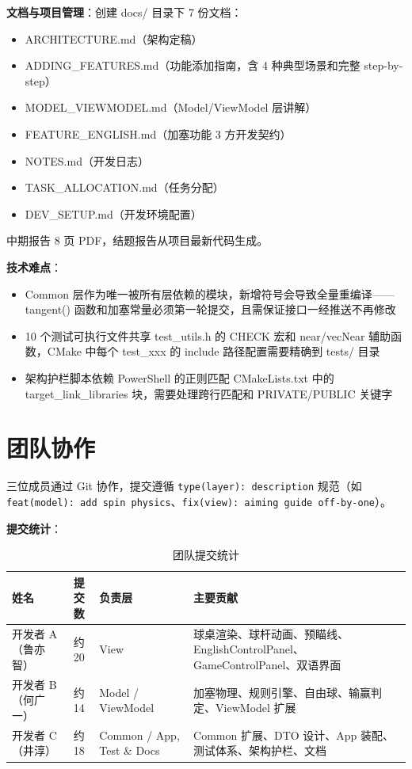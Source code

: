 \documentclass[11pt]{ctexart}
\begin{document}
\textbf{文档与项目管理}：创建 docs/ 目录下 7 份文档：
\begin{itemize}[leftmargin=*]
\item ARCHITECTURE.md（架构定稿）
\item ADDING\_FEATURES.md（功能添加指南，含 4 种典型场景和完整 step-by-step）
\item MODEL\_VIEWMODEL.md（Model/ViewModel 层讲解）
\item FEATURE\_ENGLISH.md（加塞功能 3 方开发契约）
\item NOTES.md（开发日志）
\item TASK\_ALLOCATION.md（任务分配）
\item DEV\_SETUP.md（开发环境配置）
\end{itemize}
中期报告 8 页 PDF，结题报告从项目最新代码生成。

\textbf{技术难点}：
\begin{itemize}
\item Common 层作为唯一被所有层依赖的模块，新增符号会导致全量重编译——tangent() 函数和加塞常量必须第一轮提交，且需保证接口一经推送不再修改
\item 10 个测试可执行文件共享 test\_utils.h 的 CHECK 宏和 near/vecNear 辅助函数，CMake 中每个 test\_xxx 的 include 路径配置需要精确到 tests/ 目录
\item 架构护栏脚本依赖 PowerShell 的正则匹配 CMakeLists.txt 中的 target\_link\_libraries 块，需要处理跨行匹配和 PRIVATE/PUBLIC 关键字
\end{itemize}

\section{团队协作}

三位成员通过 Git 协作，提交遵循 \texttt{type(layer): description} 规范（如 \texttt{feat(model): add spin physics}、\texttt{fix(view): aiming guide off-by-one}）。

\textbf{提交统计}：

\begin{table}[H]
\centering\small
\begin{tabular}{|p{3.2cm}|c|p{3cm}|p{5cm}|}
\hline
\textbf{姓名} & \textbf{提交数} & \textbf{负责层} & \textbf{主要贡献} \\
\hline
开发者 A（鲁亦智） & 约 20 & View & 球桌渲染、球杆动画、预瞄线、EnglishControlPanel、GameControlPanel、双语界面 \\
开发者 B（何广一） & 约 14 & Model / ViewModel & 加塞物理、规则引擎、自由球、输赢判定、ViewModel 扩展 \\
开发者 C（井淳） & 约 18 & Common / App, Test \& Docs & Common 扩展、DTO 设计、App 装配、测试体系、架构护栏、文档 \\
\hline
\end{tabular}
\caption{团队提交统计}
\end{table}
\end{document}
